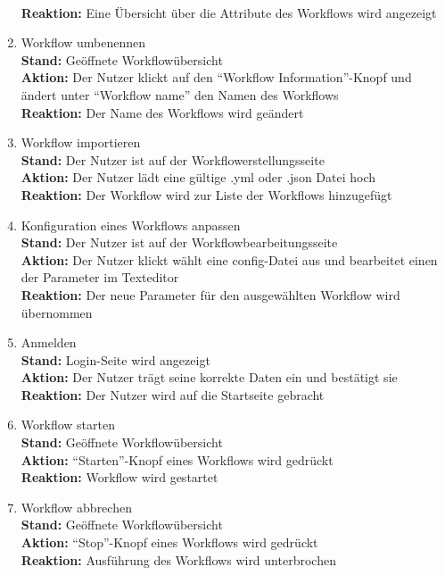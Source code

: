 \begin{enumerate}
    \\ \textbf{Reaktion:} Eine Übersicht über die Attribute des Workflows wird angezeigt
    \item Workflow umbenennen
    \\ \textbf{Stand:} Geöffnete Workflowübersicht
    \\ \textbf{Aktion:} Der \gls{Nutzer} klickt auf den \enquote{Workflow Information}-Knopf und ändert unter \enquote{Workflow name} den Namen des Workflows
    \\ \textbf{Reaktion:} Der Name des Workflows wird geändert
    \item Workflow importieren
    \\ \textbf{Stand:} Der \gls{Nutzer} ist auf der Workflowerstellungsseite 
    \\ \textbf{Aktion:} Der \gls{Nutzer} lädt eine gültige .yml oder .json Datei hoch 
    \\ \textbf{Reaktion:} Der Workflow wird zur Liste der Workflows hinzugefügt
    \item Konfiguration eines Workflows anpassen
    \\ \textbf{Stand:} Der \gls{Nutzer} ist auf der Workflowbearbeitungsseite
    \\ \textbf{Aktion:} Der \gls{Nutzer} klickt wählt eine config-Datei aus und bearbeitet einen der Parameter im Texteditor
    \\ \textbf{Reaktion:} Der neue Parameter für den ausgewählten Workflow wird übernommen
    \item Anmelden
    \\ \textbf{Stand:} Login-Seite wird angezeigt
    \\ \textbf{Aktion:} Der \gls{Nutzer} trägt seine korrekte Daten ein und bestätigt sie
    \\ \textbf{Reaktion:} Der \gls{Nutzer} wird auf die Startseite gebracht
    \item Workflow starten
    \\ \textbf{Stand:} Geöffnete Workflowübersicht 
    \\ \textbf{Aktion:} \enquote{Starten}-Knopf eines Workflows wird gedrückt
    \\ \textbf{Reaktion:} Workflow wird gestartet
    \item Workflow abbrechen
    \\ \textbf{Stand:} Geöffnete Workflowübersicht
    \\ \textbf{Aktion:} \enquote{Stop}-Knopf eines Workflows wird gedrückt
    \\ \textbf{Reaktion:} Ausführung des Workflows wird unterbrochen

\end{enumerate}
